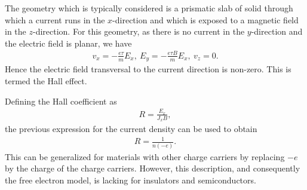 The geometry which is typically considered is a prismatic slab of solid through which a current runs in the $x$-direction and which is exposed to a magnetic field in the $z$-direction. For this geometry, as there is no current in the $y$-direction and the electric field is planar, we have
\begin{align*}
	v_{x} = -\frac{e\tau}{m}E_{x},\ E_{y} = -\frac{e\tau B}{m}E_{x},\ v_{z} = 0.
\end{align*}
Hence the electric field transversal to the current direction is non-zero. This is termed the Hall effect.

Defining the Hall coefficient as
\begin{align*}
	R = \frac{E_{x}}{J_{x}B},
\end{align*}
the previous expression for the current density can be used to obtain
\begin{align*}
	R = \frac{1}{n(-e)}.
\end{align*}
This can be generalized for materials with other charge carriers by replacing $-e$ by the charge of the charge carriers. However, this description, and consequently the free electron model, is lacking for insulators and semiconductors.